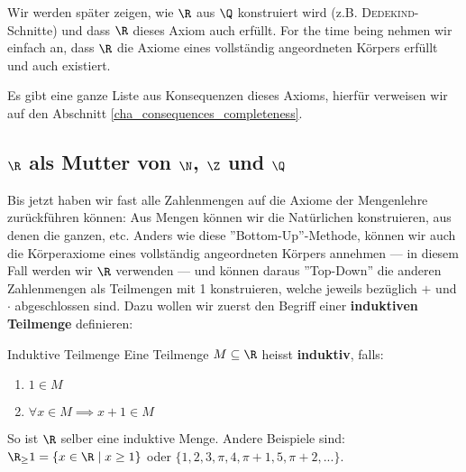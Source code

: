 Wir werden später zeigen, wie $\R$ aus $\Q$ konstruiert wird (z.B. \textsc{Dedekind}-Schnitte) und dass $\R$ dieses Axiom auch erfüllt. For the time being nehmen wir einfach an, dass $\R$ die Axiome eines vollständig angeordneten Körpers erfüllt und auch existiert.

Es gibt eine ganze Liste aus Konsequenzen dieses Axioms, hierfür verweisen wir auf den Abschnitt \ref{cha_consequences_completeness}.
 

\subsection{$\R$ als Mutter von $\N$, $\Z$ und $\Q$}
Bis jetzt haben wir fast alle Zahlenmengen auf die Axiome der Mengenlehre zurückführen können: Aus Mengen können wir die Natürlichen konstruieren, aus denen die ganzen, etc. Anders wie diese ''Bottom-Up''-Methode, können wir auch die Körperaxiome eines vollständig angeordneten Körpers annehmen --- in diesem Fall werden wir $\R$ verwenden --- und können daraus ''Top-Down'' die anderen Zahlenmengen als Teilmengen mit 1 konstruieren, welche jeweils bezüglich $+$ und $\cdot$ abgeschlossen sind. Dazu wollen wir zuerst den Begriff einer \textbf{induktiven Teilmenge} definieren:

\begin{definition}{Induktive Teilmenge}{} Eine Teilmenge $M \subseteq \R$ heisst \textbf{induktiv}, falls:
\begin{enumerate}
    \item $1 \in M$
    \item $\forall x \in M \implies x + 1 \in M$
\end{enumerate}
\end{definition}

\begin{example}
So ist $\R$ selber eine induktive Menge. Andere Beispiele sind: $\R_\geq1 = \{x \in \R \mid x \geq 1\}$ oder $\{1, 2, 3, \pi, 4, \pi + 1, 5 , \pi + 2, ...\}$.
\end{example}

